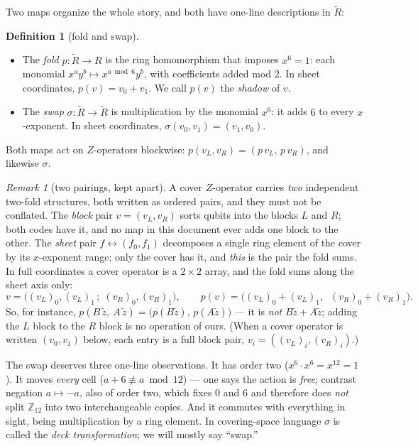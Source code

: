 \documentclass[11pt]{article}
\theoremstyle{plain}
\theoremstyle{definition}
\newtheorem{definition}[theorem]{Definition}
\theoremstyle{remark}
\newtheorem{remark}[theorem]{Remark}
\newcommand{\Z}{\mathbb{Z}}
\newcommand{\Rbase}{R}
\newcommand{\Rcov}{\widetilde{R}}
\begin{document}
Two maps organize the whole story, and both have one-line descriptions in
$\Rcov$:

\begin{definition}[fold and swap]\label{def:foldswap}
\leavevmode
\begin{itemize}[leftmargin=2em]
\item The \emph{fold} $p : \Rcov \to \Rbase$ is the ring homomorphism that
  imposes $x^6 = 1$: each monomial $x^a y^b \mapsto x^{a \bmod 6} y^b$, with
  coefficients added mod 2. In sheet coordinates, $p(v) = v_0 + v_1$. We call
  $p(v)$ the \emph{shadow} of $v$.
\item The \emph{swap} $\sigma : \Rcov \to \Rcov$ is multiplication by the
  monomial $x^6$: it adds $6$ to every $x$-exponent. In sheet coordinates,
  $\sigma(v_0, v_1) = (v_1, v_0)$.
\end{itemize}
Both maps act on $Z$-operators blockwise: $p(v_L, v_R) = (p\,v_L,\, p\,v_R)$,
and likewise $\sigma$.
\end{definition}

\begin{remark}[two pairings, kept apart]\label{rem:twopairs}
A cover $Z$-operator carries \emph{two} independent two-fold structures,
both written as ordered pairs, and they must not be conflated. The
\emph{block} pair $v = (v_L, v_R)$ sorts qubits into the blocks $L$ and $R$;
both codes have it, and no map in this document ever adds one block to the
other. The \emph{sheet} pair $f \leftrightarrow (f_0, f_1)$ decomposes a
single ring element of the cover by its $x$-exponent range; only the cover
has it, and \emph{this} is the pair the fold sums. In full coordinates a
cover operator is a $2 \times 2$ array, and the fold sums along the sheet
axis only:
\[
v = \bigl( (v_L)_0, (v_L)_1 \,;\; (v_R)_0, (v_R)_1 \bigr),
\qquad
p(v) = \bigl( (v_L)_0 + (v_L)_1,\;\; (v_R)_0 + (v_R)_1 \bigr).
\]
So, for instance, $p(B\,\widetilde z,\ A\,\widetilde z) =
\bigl(p(B\widetilde z),\, p(A\widetilde z)\bigr)$ --- it is \emph{not}
$B\widetilde z + A\widetilde z$; adding the $L$ block to the $R$ block is no
operation of ours. (When a cover operator is written $(v_0, v_1)$ below,
each entry is a full block pair, $v_i = ((v_L)_i, (v_R)_i)$.)
\end{remark}

The swap deserves three one-line observations. It has order two ($x^6 \cdot
x^6 = x^{12} = 1$). It moves \emph{every} cell ($a + 6 \not\equiv a \bmod
12$) --- one says the action is \emph{free}; contrast negation $a \mapsto -a$,
also of order two, which fixes $0$ and $6$ and therefore does \emph{not} split
$\Z_{12}$ into two interchangeable copies. And it commutes with everything in
sight, being multiplication by a ring element. In covering-space language
$\sigma$ is called the \emph{deck transformation}; we will mostly say
``swap.''
\end{document}
